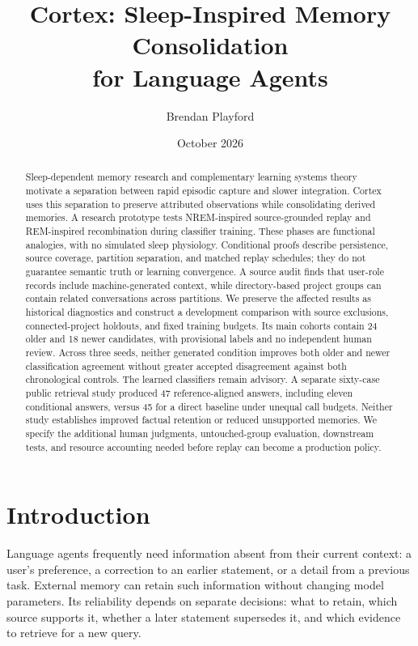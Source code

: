 \documentclass[11pt]{article}
\title{Cortex: Sleep-Inspired Memory Consolidation\\for Language Agents}
\author{Brendan Playford}
\date{October 2026}
\begin{document}
\maketitle
\begin{abstract}
Sleep-dependent memory research and complementary learning systems theory motivate a separation between rapid episodic capture and slower integration. Cortex uses this separation to preserve attributed observations while consolidating derived memories. A research prototype tests NREM-inspired source-grounded replay and REM-inspired recombination during classifier training. These phases are functional analogies, with no simulated sleep physiology. Conditional proofs describe persistence, source coverage, partition separation, and matched replay schedules; they do not guarantee semantic truth or learning convergence. A source audit finds that user-role records include machine-generated context, while directory-based project groups can contain related conversations across partitions. We preserve the affected results as historical diagnostics and construct a development comparison with source exclusions, connected-project holdouts, and fixed training budgets. Its main cohorts contain 24 older and 18 newer candidates, with provisional labels and no independent human review. Across three seeds, neither generated condition improves both older and newer classification agreement without greater accepted disagreement against both chronological controls. The learned classifiers remain advisory. A separate sixty-case public retrieval study produced 47 reference-aligned answers, including eleven conditional answers, versus 45 for a direct baseline under unequal call budgets. Neither study establishes improved factual retention or reduced unsupported memories. We specify the additional human judgments, untouched-group evaluation, downstream tests, and resource accounting needed before replay can become a production policy.
\end{abstract}

\section{Introduction}
Language agents frequently need information absent from their current context: a user's preference, a correction to an earlier statement, or a detail from a previous task. External memory can retain such information without changing model parameters. Its reliability depends on separate decisions: what to retain, which source supports it, whether a later statement supersedes it, and which evidence to retrieve for a new query.
\end{document}
